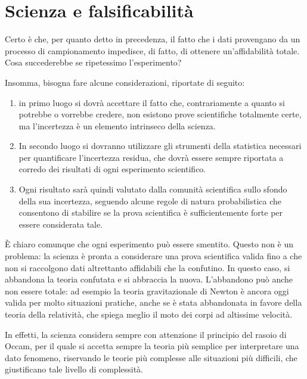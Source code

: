 \documentclass[a4paper,12pt,oneside]{book}
\providecommand{\tightlist}{%
  \setlength{\itemsep}{0pt}\setlength{\parskip}{0pt}}
\begin{document}
\hypertarget{scienza-e-falsificabilita}{%
\section{Scienza e falsificabilità}\label{scienza-e-falsificabilita}}

Certo è che, per quanto detto in precedenza, il fatto che i dati provengano da un processo di campionamento impedisce, di fatto, di ottenere un'affidabilità totale. Cosa succederebbe se ripetessimo l'esperimento?

Insomma, bisogna fare alcune considerazioni, riportate di seguito:

\begin{enumerate}
\def\labelenumi{\arabic{enumi}.}
\tightlist
\item
  in primo luogo si dovrà accettare il fatto che, contrariamente a quanto si potrebbe o vorrebbe credere, non esistono prove scientifiche totalmente certe, ma l'incertezza è un elemento intrinseco della scienza.
\item
  In secondo luogo si dovranno utilizzare gli strumenti della statistica necessari per quantificare l'incertezza residua, che dovrà essere sempre riportata a corredo dei risultati di ogni esperimento scientifico.
\item
  Ogni risultato sarà quindi valutato dalla comunità scientifica sullo sfondo della sua incertezza, seguendo alcune regole di natura probabilistica che consentono di stabilire se la prova scientifica è sufficientemente forte per essere considerata tale.
\end{enumerate}

È chiaro comunque che ogni esperimento può essere smentito. Questo non è un problema: la scienza è pronta a considerare una prova scientifica valida fino a che non si raccolgono dati altrettanto affidabili che la confutino. In questo caso, si abbandona la teoria confutata e si abbraccia la nuova. L'abbandono può anche non essere totale: ad esempio la teoria gravitazionale di Newton è ancora oggi valida per molto situazioni pratiche, anche se è stata abbandonata in favore della teoria della relatività, che spiega meglio il moto dei corpi ad altissime velocità.

In effetti, la scienza considera sempre con attenzione il principio del rasoio di Occam, per il quale si accetta sempre la teoria più semplice per interpretare una dato fenomeno, riservando le teorie più complesse alle situazioni più difficili, che giustificano tale livello di complessità.
\end{document}
